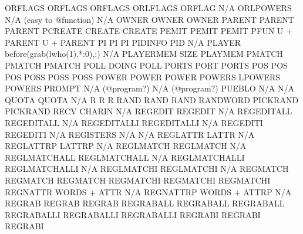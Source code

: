 \documentclass[letterpaper,10pt,english]{sphinxmanual}
\begin{document}
\begin{sphinxVerbatim}[commandchars=\\\{\}]
ORFLAGS                 ORFLAGS                      ORFLAGS
ORLFLAGS                ORFLAG                       N/A
ORLPOWERS               N/A (easy to @function)      N/A
OWNER                   OWNER                        OWNER
PARENT                  PARENT                       PARENT
PCREATE                 CREATE                       CREATE
PEMIT                   PEMIT                        PEMIT
PFUN                    U + PARENT                   U + PARENT
PI                      PI                           PI
PIDINFO                 PID                          N/A
PLAYER                  before(grab(lwho(1),*:\PYGZpc{}0),:) N/A
PLAYERMEM               SIZE                         PLAYMEM
PMATCH                  PMATCH                       PMATCH
POLL                    DOING                        POLL
PORTS                   PORT                         PORTS
POS                     POS                          POS
POSS                    POSS                         POSS
POWER                   POWER                        POWER
POWERS                  LPOWERS                      POWERS
PROMPT                  N/A (@program?)              N/A (@program?)
PUEBLO                  N/A                          N/A
QUOTA                   QUOTA                        N/A
R                       R                            R
RAND                    RAND                         RAND
RANDWORD                PICKRAND                     PICKRAND
RECV                    CHARIN                       N/A
REGEDIT                 REGEDIT                      N/A
REGEDITALL              REGEDITALL                   N/A
REGEDITALLI             REGEDITALLI                  N/A
REGEDITI                REGEDITI                     N/A
REGISTERS               N/A                          N/A
REGLATTR                LATTR                        N/A
REGLATTRP               LATTRP                       N/A
REGLMATCH               REGLMATCH                    N/A
REGLMATCHALL            REGLMATCHALL                 N/A
REGLMATCHALLI           REGLMATCHALLI                N/A
REGLMATCHI              REGLMATCHI                   N/A
REGMATCH                REGMATCH                     REGMATCH
REGMATCHI               REGMATCHI                    REGMATCHI
REGNATTR                WORDS + ATTR                 N/A
REGNATTRP               WORDS + ATTRP                N/A
REGRAB                  REGRAB                       REGRAB
REGRABALL               REGRABALL                    REGRABALL
REGRABALLI              REGRABALLI                   REGRABALLI
REGRABI                 REGRABI                      REGRABI

\end{sphinxVerbatim}
\end{document}
